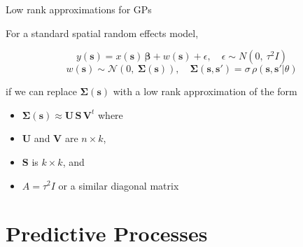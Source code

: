 \documentclass[11pt,ignorenonframetext,]{beamer}
\begin{document}
\begin{frame}[t]{Low rank approximations for GPs}

For a standard spatial random effects model,

\[ y(\bm{s}) = x(\bm{s}) \, \bm{\beta} + w(\bm{s}) + \epsilon, \quad \epsilon \sim N(0,~\tau^2 I) \]
\[ w(\bm{s}) \sim \mathcal{N}(0,~\bm{\Sigma}(\bm{s})), \quad \bm{\Sigma}(\bm{s},\bm{s}')=\sigma\,\rho(\bm{s},\bm{s}'|\theta) \]

if we can replace \(\bm{\Sigma}(\bm{s})\) with a low rank approximation
of the form

\begin{itemize}
\item
  \(\bm{\Sigma}(\bm{s}) \approx \bm{U}\,\bm{S}\,\bm{V}^t\) where
\item
  \(\bm{U}\) and \(\bm{V}\) are \(n \times k\),
\item
  \(\bm{S}\) is \(k \times k\), and
\item
  \(A = \tau^2 I\) or a similar diagonal matrix
\end{itemize}

\end{frame}

\section{Predictive Processes}\label{predictive-processes}
\end{document}
